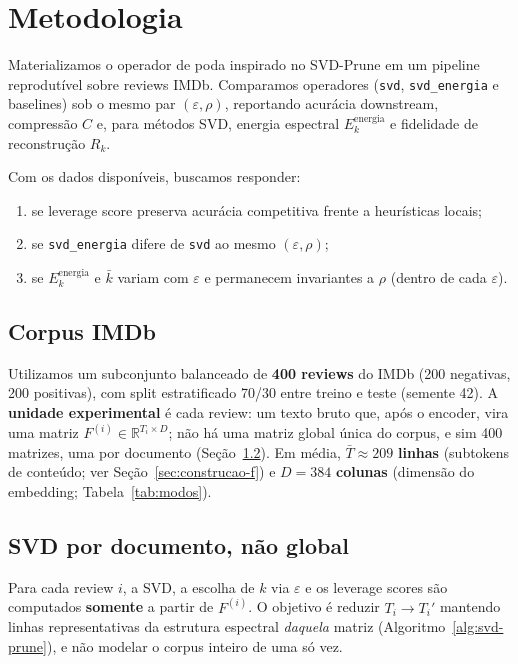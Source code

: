 \section{Metodologia}\label{sec:metodologia}

Materializamos o operador de poda inspirado no SVD-Prune em um pipeline reprodutível sobre reviews IMDb. Comparamos operadores (\texttt{svd}, \texttt{svd\_energia} e baselines) sob o mesmo par $(\varepsilon, \rho)$, reportando acurácia downstream, compressão $C$ e, para métodos SVD, energia espectral $E_k^{\mathrm{energia}}$ e fidelidade de reconstrução $R_k$.

Com os dados disponíveis, buscamos responder:
\begin{enumerate}
    \item se leverage score preserva acurácia competitiva frente a heurísticas locais;
    \item se \texttt{svd\_energia} difere de \texttt{svd} ao mesmo $(\varepsilon, \rho)$;
    \item se $E_k^{\mathrm{energia}}$ e $\bar{k}$ variam com $\varepsilon$ e permanecem invariantes a $\rho$ (dentro de cada $\varepsilon$).
\end{enumerate}

\subsection{Corpus IMDb}\label{sec:corpus}

Utilizamos um subconjunto balanceado de \textbf{400 reviews} do IMDb (200 negativas, 200 positivas), com split estratificado 70/30 entre treino e teste (semente 42). A \textbf{unidade experimental} é cada review: um texto bruto que, após o encoder, vira uma matriz $F^{(i)} \in \mathbb{R}^{T_i \times D}$; não há uma matriz global única do corpus, e sim 400 matrizes, uma por documento (Seção~\ref{sec:svd-por-documento}). Em média, $\bar{T} \approx 209$ \textbf{linhas} (subtokens de conteúdo; ver Seção~\ref{sec:construcao-f}) e $D = 384$ \textbf{colunas} (dimensão do embedding; Tabela~\ref{tab:modos}).

\subsection{SVD por documento, não global}\label{sec:svd-por-documento}

Para cada review $i$, a SVD, a escolha de $k$ via $\varepsilon$ e os leverage scores são computados \textbf{somente} a partir de $F^{(i)}$. O objetivo é reduzir $T_i \to T_i'$ mantendo linhas representativas da estrutura espectral \emph{daquela} matriz (Algoritmo~\ref{alg:svd-prune}), e não modelar o corpus inteiro de uma só vez.

